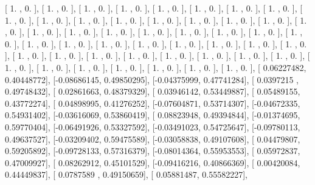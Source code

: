 \documentclass{article}
\begin{document}
       [ 1.        ,  0.        ],
       [ 1.        ,  0.        ],
       [ 1.        ,  0.        ],
       [ 1.        ,  0.        ],
       [ 1.        ,  0.        ],
       [ 1.        ,  0.        ],
       [ 1.        ,  0.        ],
       [ 1.        ,  0.        ],
       [ 1.        ,  0.        ],
       [ 1.        ,  0.        ],
       [ 1.        ,  0.        ],
       [ 1.        ,  0.        ],
       [ 1.        ,  0.        ],
       [ 1.        ,  0.        ],
       [ 1.        ,  0.        ],
       [ 1.        ,  0.        ],
       [ 1.        ,  0.        ],
       [ 1.        ,  0.        ],
       [ 1.        ,  0.        ],
       [ 1.        ,  0.        ],
       [ 1.        ,  0.        ],
       [ 1.        ,  0.        ],
       [ 1.        ,  0.        ],
       [ 1.        ,  0.        ],
       [ 1.        ,  0.        ],
       [ 1.        ,  0.        ],
       [ 1.        ,  0.        ],
       [ 1.        ,  0.        ],
       [ 1.        ,  0.        ],
       [ 1.        ,  0.        ],
       [ 1.        ,  0.        ],
       [ 1.        ,  0.        ],
       [ 1.        ,  0.        ],
       [ 1.        ,  0.        ],
       [ 1.        ,  0.        ],
       [ 1.        ,  0.        ],
       [ 1.        ,  0.        ],
       [ 1.        ,  0.        ],
       [ 1.        ,  0.        ],
       [ 1.        ,  0.        ],
       [ 1.        ,  0.        ],
       [ 1.        ,  0.        ],
       [ 1.        ,  0.        ],
       [ 1.        ,  0.        ],
       [ 1.        ,  0.        ],
       [ 1.        ,  0.        ],
       [ 1.        ,  0.        ],
       [ 1.        ,  0.        ],
       [ 0.06227482,  0.40448772],
       [-0.08686145,  0.49850295],
       [-0.04375999,  0.47741284],
       [ 0.0397215 ,  0.49748432],
       [ 0.02861663,  0.48379329],
       [ 0.03946142,  0.53449887],
       [ 0.05489155,  0.43772274],
       [ 0.04898995,  0.41276252],
       [-0.07604871,  0.53714307],
       [-0.04672335,  0.54931402],
       [-0.03616069,  0.53860419],
       [ 0.08823948,  0.49394844],
       [-0.01374695,  0.59770404],
       [-0.06491926,  0.53327592],
       [-0.03491023,  0.54725647],
       [-0.09780113,  0.49637527],
       [-0.03209402,  0.59475589],
       [-0.03058838,  0.49107608],
       [ 0.04479807,  0.59205892],
       [-0.09728133,  0.57316379],
       [-0.08014364,  0.55953553],
       [ 0.05972837,  0.47009927],
       [ 0.08262912,  0.45101529],
       [-0.09416216,  0.40866369],
       [ 0.00420084,  0.44449837],
       [ 0.0787589 ,  0.49150659],
       [ 0.05881487,  0.55582227],
\end{document}
